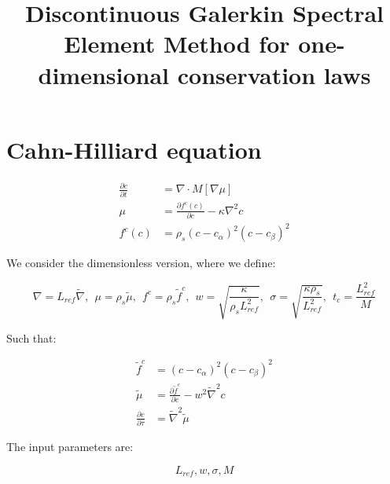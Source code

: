 \documentclass[10pt,a4paper]{article}
\title{\textbf{Discontinuous Galerkin Spectral Element Method for one-dimensional conservation laws}}
\begin{document}
\tableofcontents
\section{Cahn-Hilliard equation}

\begin{align}
\frac{\partial c}{\partial t}&=\nabla\cdot M[\nabla \mu]\\
\mu &= \frac{\partial f^c(c)}{\partial c} - \kappa \nabla^2 c \\
f^c(c)&=\rho_s(c-c_\alpha)^2(c-c_\beta)^2
\end{align}

We consider the dimensionless version, where we define:

\begin{equation}
\nabla = L_{ref}\tilde{\nabla},~~ \mu = \rho_s\tilde{\mu},~~f^c = \rho_s\tilde{f}^c,~~w=\sqrt{\frac{\kappa}{\rho_s L_{ref}^2}},~~ \sigma = \sqrt{\frac{\kappa\rho_s}{L_{ref}^2}},~~t_c = \frac{L_{ref}^2}{M}
\end{equation}

Such that:

\begin{align}
\tilde{f}^c &= (c-c_\alpha)^2(c-c_\beta)^2\\
\tilde{\mu} &= \frac{\partial \tilde{f}^c}{\partial c} - w^2 \tilde{\nabla}^2 c\\
\frac{\partial c}{\partial \tau} &= \tilde{\nabla}^2 \tilde{\mu}
\end{align}

The input parameters are:

\begin{equation}
L_{ref}, w, \sigma, M
\end{equation}
\end{document}
